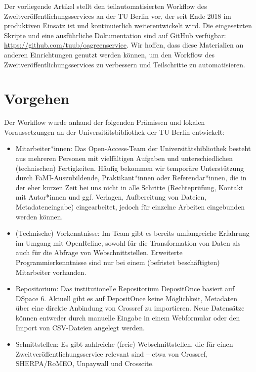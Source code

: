 \documentclass[a4paper,
fontsize=11pt,
oneside,
numbers=noperiodatend,
parskip=half-,
bibliography=totoc,
final
]{scrartcl}
\begin{document}
Der vorliegende Artikel stellt den teilautomatisierten Workflow des
Zweitveröffentlichungsservices an der TU Berlin vor, der seit Ende 2018
im produktiven Einsatz ist und kontinuierlich weiterentwickelt wird. Die
eingesetzten Skripte und eine ausführliche Dokumentation sind auf GitHub
verfügbar: \url{https://github.com/tuub/oagreenservice}. Wir hoffen,
dass diese Materialien an anderen Einrichtungen genutzt werden können,
um den Workflow des Zweitveröffentlichungsservices zu verbessern und
Teilschritte zu automatisieren.

\hypertarget{vorgehen}{%
\section{Vorgehen}\label{vorgehen}}

Der Workflow wurde anhand der folgenden Prämissen und lokalen
Voraussetzungen an der Universitätsbibliothek der TU Berlin entwickelt:

\begin{itemize}
\item
  Mitarbeiter*innen: Das Open-Access-Team der Universitätsbibliothek
  besteht aus mehreren Personen mit vielfältigen Aufgaben und
  unterschiedlichen (technischen) Fertigkeiten. Häufig bekommen wir
  temporäre Unterstützung durch FaMI-Auszubildende, Praktikant*innen
  oder Referendar*innen, die in der eher kurzen Zeit bei uns nicht in
  alle Schritte (Rechteprüfung, Kontakt mit Autor*innen und ggf.
  Verlagen, Aufbereitung von Dateien, Metadateneingabe) eingearbeitet,
  jedoch für einzelne Arbeiten eingebunden werden können.
\item
  (Technische) Vorkenntnisse: Im Team gibt es bereits umfangreiche
  Erfahrung im Umgang mit OpenRefine, sowohl für die Transformation von
  Daten als auch für die Abfrage von Webschnittstellen. Erweiterte
  Programmierkenntnisse sind nur bei einem (befristet beschäftigten)
  Mitarbeiter vorhanden.
\item
  Repositorium: Das institutionelle Repositorium DepositOnce basiert auf
  DSpace 6. Aktuell gibt es auf DepositOnce keine Möglichkeit, Metadaten
  über eine direkte Anbindung von Crossref zu importieren. Neue
  Datensätze können entweder durch manuelle Eingabe in einem Webformular
  oder den Import von CSV-Dateien angelegt werden.
\item
  Schnittstellen: Es gibt zahlreiche (freie) Webschnittstellen, die für
  einen Zweitveröffentlichungsservice relevant sind -- etwa von
  Crossref, SHERPA/RoMEO, Unpaywall und Crosscite.
\end{itemize}
\end{document}
